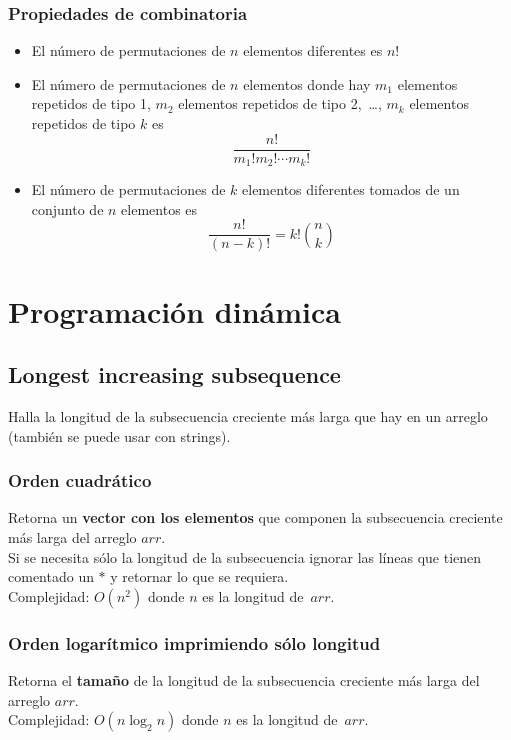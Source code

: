 \documentclass[10pt,letterpaper,twocolumn]{article}
\newcommand{\source}[1]{
  
  \dotfill
}
\begin{document}
    \subsubsection{Propiedades de combinatoria}
    \begin{itemize}
      \item El número de permutaciones de $n$ elementos diferentes es $n!$
      \item El número de permutaciones de $n$ elementos donde hay $m_1$ elementos repetidos de tipo 1, $m_2$ elementos repetidos de tipo 2,~\ldots, $m_k$ elementos repetidos de tipo $k$ es $$\frac{n!}{m_1! m_2! \cdots m_k!} $$
      \item El número de permutaciones de $k$ elementos diferentes tomados de un conjunto de $n$ elementos es $$ \frac{n!}{(n-k)!} = k! \binom{n}{k}$$
    \end{itemize}



\section{Programación dinámica}
  \subsection{Longest increasing subsequence}
    Halla la longitud de la subsecuencia creciente más larga que hay en un arreglo (también se puede usar con strings).
    \subsubsection{Orden cuadrático}
      Retorna un \textbf{vector con los elementos} que componen la subsecuencia creciente más larga del arreglo $arr$.\\
      Si se necesita sólo la longitud de la subsecuencia ignorar las líneas que tienen comentado un $*$ y retornar lo que se requiera.\\
      Complejidad: $O(n^2)$ donde $n$ es la longitud de~$arr$.
      \source{src/lisn2.cpp}
    \subsubsection{Orden logarítmico imprimiendo sólo longitud}
      Retorna el \textbf{tamaño} de la longitud de la subsecuencia creciente más larga del arreglo $arr$.\\
      Complejidad: $O(n \log_2 n)$ donde $n$ es la longitud de~$arr$.
      \source{src/lislognlength.cpp}
\end{document}
